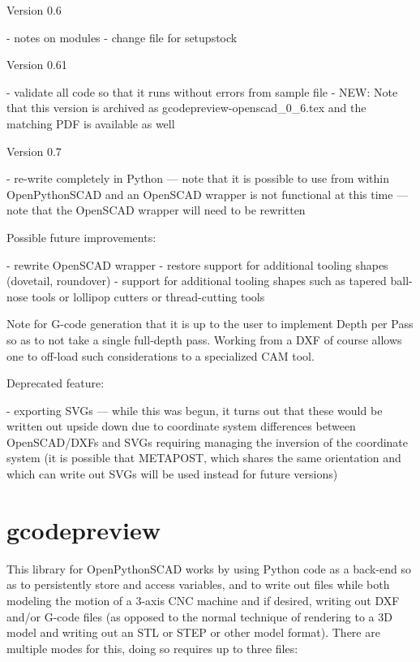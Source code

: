 \documentclass{ltxdoc}
\begin{document}
\begin{readme}
Version 0.6

 - notes on modules
 - change file for setupstock

Version 0.61

 - validate all code so that it runs without errors from sample file
 - NEW: Note that this version is archived as gcodepreview-openscad_0_6.tex and the matching PDF is available as well
 
 Version 0.7
 
  - re-write completely in Python --- note that it is possible to use from within OpenPythonSCAD and an OpenSCAD wrapper is not functional at this time --- note that the OpenSCAD wrapper will need to be rewritten

Possible future improvements:

 - rewrite OpenSCAD wrapper
 - restore support for additional tooling shapes (dovetail, roundover)
 - support for additional tooling shapes such as tapered ball-nose tools or lollipop cutters or thread-cutting tools

Note for G-code generation that it is up to the user to implement Depth per Pass so as to not take a single full-depth pass. Working from a DXF of course allows one to off-load such considerations to a specialized CAM tool.

Deprecated feature:

 - exporting SVGs --- while this was begun, it turns out that these would be written out upside down due to coordinate system differences between OpenSCAD/DXFs and SVGs requiring managing the inversion of the coordinate system (it is possible that METAPOST, which shares the same orientation and which can write out SVGs will be used instead for future versions)

\end{readme}

\clearpage
\section{gcodepreview}

This library for OpenPythonSCAD works by using Python code as a back-end so as to persistently store and access variables, and to write out files while both modeling the motion of a 3-axis CNC machine and if desired, writing out DXF and/or G-code files (as opposed to the normal technique of rendering to a 3D model and writing out an STL or STEP or other model format). There are multiple modes for this, doing so requires up to three files:
\end{document}
